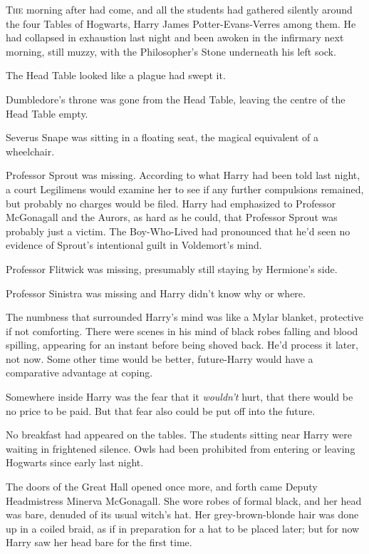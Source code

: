 
\lettrine{T}{he} morning after had come, and all the students had gathered silently around the four Tables of Hogwarts, Harry James Potter-Evans-Verres among them. He had collapsed in exhaustion last night and been awoken in the infirmary next morning, still muzzy, with the Philosopher's Stone underneath his left sock.

The Head Table looked like a plague had swept it.

Dumbledore's throne was gone from the Head Table, leaving the centre of the Head Table empty.

Severus Snape was sitting in a floating seat, the magical equivalent of a wheelchair.

Professor Sprout was missing. According to what Harry had been told last night, a court Legilimens would examine her to see if any further compulsions remained, but probably no charges would be filed. Harry had emphasized to Professor McGonagall and the Aurors, as hard as he could, that Professor Sprout was probably just a victim. The Boy-Who-Lived had pronounced that he'd seen no evidence of Sprout's intentional guilt in Voldemort's mind.

Professor Flitwick was missing, presumably still staying by Hermione's side.

Professor Sinistra was missing and Harry didn't know why or where.

The numbness that surrounded Harry's mind was like a Mylar blanket, protective if not comforting. There were scenes in his mind of black robes falling and blood spilling, appearing for an instant before being shoved back. He'd process it later, not now. Some other time would be better, future-Harry would have a comparative advantage at coping.

Somewhere inside Harry was the fear that it \emph{wouldn't} hurt, that there would be no price to be paid. But that fear also could be put off into the future.

No breakfast had appeared on the tables. The students sitting near Harry were waiting in frightened silence. Owls had been prohibited from entering or leaving Hogwarts since early last night.

The doors of the Great Hall opened once more, and forth came Deputy Headmistress Minerva McGonagall. She wore robes of formal black, and her head was bare, denuded of its usual witch's hat. Her grey-brown-blonde hair was done up in a coiled braid, as if in preparation for a hat to be placed later; but for now Harry saw her head bare for the first time.

